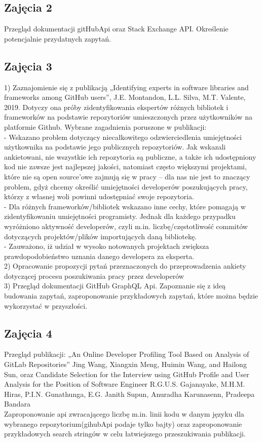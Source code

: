 \documentclass[graybox]{svmult}
\begin{document}
\subsection{Zajęcia 2}
Przegląd dokumentacji gitHubApi oraz Stack Exchange API. Określenie potencjalnie przydatnych zapytań.
\subsection{Zajęcia 3}
1) Zaznajomienie się z publikacją „Identifying experts in software libraries and frameworks among GitHub users”, J.E. Montandon, L.L. Silva, M.T. Valente, 2019. Dotyczy ona próby zidentyfikowania ekspertów różnych bibliotek i frameworków na podstawie repozytoriów umieszczonych przez użytkowników na platformie Github. Wybrane zagadnienia poruszone w publikacji:\\
- Wskazano problem dotyczący niecałkowitego odzwierciedlenia umiejętności użytkownika na podstawie jego publicznych repozytoriów. Jak wskazali ankietowani, nie wszystkie ich repozytoria są publiczne, a także ich udostępniony kod nie zawsze jest najlepszej jakości, natomiast często większymi projektami, które nie są open source’owe zajmują się w pracy – dla nas nie jest to znaczący problem, gdyż chcemy określić umiejętności developerów poszukujących pracy, którzy z własnej woli powinni udostępniać swoje repozytoria.\\
- Dla różnych frameworków/bibliotek wskazano inne cechy, które pomagają w zidentyfikowaniu umiejętności programisty. Jednak dla każdego przypadku wyróżniono aktywność developerów, czyli m.in. liczbę/częstotliwość commitów dotyczących projektów/plików importujących daną bibliotekę.\\
- Zauważono, iż udział w wysoko notowanych projektach zwiększa prawdopodobieństwo uznania danego developera za eksperta.\\
2) Opracowanie propozycji pytań przeznaczonych do przeprowadzenia ankiety dotyczącej procesu poszukiwania pracy przez developerów\\
3) Przegląd dokumentacji GitHub GraphQL Api. Zapoznanie się z ideą budowania zapytań, zaproponowanie przykładowych zapytań, które można będzie wykorzystać w przyszłości.
\subsection{Zajęcia 4}
Przegląd publikacji: „An Online Developer Profiling Tool Based on Analysis of GitLab Repositories” Jing Wang, Xiangxin Meng, Huimin Wang, and Hailong Sun, oraz Candidate Selection for the Interview using GitHub Profile and User Analysis for the Position of Software Engineer R.G.U.S. Gajanayake, M.H.M. Hiras, P.I.N. Gunathunga, E.G. Janith Supun, Anuradha Karunasenn, Pradeepa Bandara\\
Zaproponowanie api zwracającego liczbę m.in. linii kodu w danym języku dla wybranego repozytorium(gihubApi podaje tylko bajty) oraz zaproponowanie przykładowych search stringów w celu łatwiejszego przeszukiwania publikacji.
\end{document}
